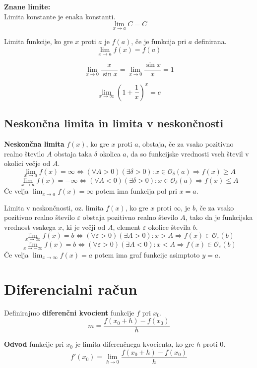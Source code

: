 \documentclass[a4paper,oneside,12pt,fleqn]{article}
\def\limh{\lim_{h\rightarrow0}} %
\renewcommand\implies\Rightarrow
\renewcommand\iff\Leftrightarrow
\numberwithin{equation}{section}
\begin{document}
\textbf{Znane limite:}\\
Limita konstante je enaka konstanti.
\[ \lim_{x\rightarrow a}C = C \]

Limita funkcije, ko gre $x$ proti $a$ je $f(a)$, če je funkcija pri $a$ definirana.
\[ \lim_{x\rightarrow a}f(x) = f(a) \]

\[ \lim_{x\rightarrow 0} \frac{x}{\sin{x}} = \lim_{x\rightarrow 0} \frac{\sin{x}}{x} = 1 \]

\[\lim_{x\rightarrow\infty} \left( 1+\frac{1}{x} \right)^x = e \]

\subsection{Neskončna limita in limita v neskončnosti}
\textbf{Neskončna limita} $f(x)$, ko gre $x$ proti $a$, obstaja, če za vsako pozitivno realno število $A$
obstaja taka $\delta$ okolica $a$, da so funkcijske vrednosti vseh števil v okolici večje
od $A$.
\[ \lim_{x\rightarrow a}f(x) = \infty \iff (\forall A > 0)(\exists \delta > 0): x \in
\mathcal{O}_\delta(a) \implies f(x) \ge A \]
\[ \lim_{x\rightarrow a}f(x) = -\infty \iff (\forall A < 0)(\exists \delta > 0): x \in
\mathcal{O}_\delta(a) \implies f(x) \le A \]
Če velja $\displaystyle\lim_{x\rightarrow a}f(x) = \infty$ potem ima funkcija pol pri $x = a$.


Limita v neskončnosti, oz. limita $f(x)$, ko gre $x$ proti $\infty$, je $b$, če za vsako
pozitivno realno število $\varepsilon$ obstaja pozitivno realno število $A$, tako da je
funkcijska vrednost vsakega $x$, ki je večji od $A$, element $\varepsilon$ okolice števila $b$.
\[ \lim_{x\rightarrow\infty}f(x) = b \iff (\forall\varepsilon>0)(\exists A>0): x > A
\implies f(x) \in \mathcal{O}_\varepsilon(b) \]
\[ \lim_{x\rightarrow-\infty}f(x) = b \iff (\forall\varepsilon>0)(\exists A<0): x < A
\implies f(x) \in \mathcal{O}_\varepsilon(b) \]
Če velja $\displaystyle\lim_{x\rightarrow\infty}f(x) = a$ potem ima graf funkcije asimptoto $y = a$.

\section{Diferencialni račun}
\label{sec:odvod}
Definirajmo \textbf{diferenčni kvocient} funkcije $f$ pri $x_0$.
\[ m = \frac{f(x_0 + h) - f(x_0)}{h} \]

\textbf{Odvod} funkcije pri $x_0$ je limita diferenčnega kvocienta, ko gre $h$ proti 0.
\[ f'(x_0) = \limh  \frac{f(x_0+h)-f(x_0)}{h} \]
\end{document}
